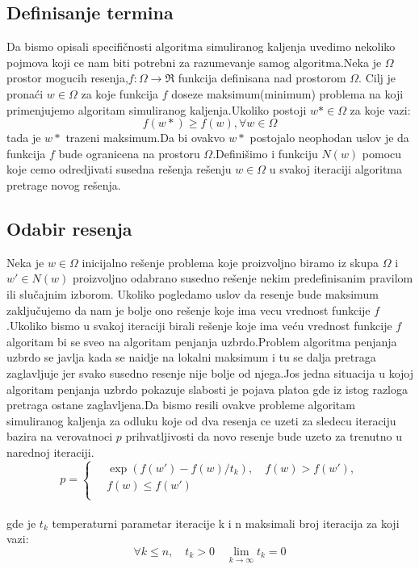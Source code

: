 \documentclass[a4paper]{article}
\begin{document}
\subsection{Definisanje termina}
Da bismo opisali specifičnosti algoritma simuliranog kaljenja uvedimo nekoliko pojmova koji ce nam biti potrebni za razumevanje samog algoritma.Neka je $\Omega$ prostor mogucih resenja,$f:\Omega \rightarrow \Re$ funkcija definisana nad prostorom $\Omega$. Cilj je pronaći  $w\in\Omega$ za koje funkcija $f$ doseze maksimum(minimum) problema na koji primenjujemo algoritam simuliranog kaljenja.Ukoliko postoji $w*\in\Omega$ za koje  vazi:$$f(w*)\geq f(w) , \forall w \in \Omega$$ tada je $w*$ trazeni maksimum.Da bi ovakvo $w*$ postojalo neophodan uslov je da funkcija $f$ bude ogranicena na prostoru $\Omega$.Definišimo i funkciju $N(w)$ pomocu koje cemo odredjivati susedna rešenja rešenju  $w\in\Omega$ u svakoj iteraciji algoritma pretrage novog rešenja. \par

\subsection{Odabir resenja}
Neka je $w\in\Omega$ inicijalno rešenje problema koje proizvoljno biramo iz skupa $\Omega$ i $w'\in N(w)$ proizvoljno odabrano susedno rešenje nekim predefinisanim pravilom ili slučajnim izborom. Ukoliko pogledamo uslov da resenje bude maksimum zaključujemo da nam je bolje ono rešenje koje ima vecu vrednost funkcije $f$.Ukoliko bismo u svakoj iteraciji birali rešenje koje ima veću vrednost funkcije $f$ algoritam bi se sveo na algoritam penjanja uzbrdo.Problem algoritma penjanja uzbrdo se javlja kada se naidje na lokalni maksimum i tu se dalja pretraga zaglavljuje jer svako susedno resenje nije bolje od njega.Jos jedna situacija u kojoj algoritam penjanja uzbrdo pokazuje slabosti je pojava platoa gde iz istog razloga pretraga ostane zaglavljena.Da bismo resili ovakve probleme algoritam simuliranog kaljenja za odluku koje od dva resenja ce uzeti za sledecu iteraciju bazira na verovatnoci $p$ prihvatljivosti da novo resenje bude uzeto za trenutno u narednoj iteraciji.
$$ p =
  \begin{cases}
     \quad \exp(f(w')-f(w)/t_k),  \quad f(w) > f(w'), \\
      \quad f(w) \leq f(w') \\
  \end{cases}
$$ \\


gde je $t_k$ temperaturni parametar iteracije k i n maksimali broj iteracija za koji vazi:
$$\forall k\leq n, \quad t_k > 0 \quad \lim_{k \to \infty}t_k=0 $$
\end{document}
